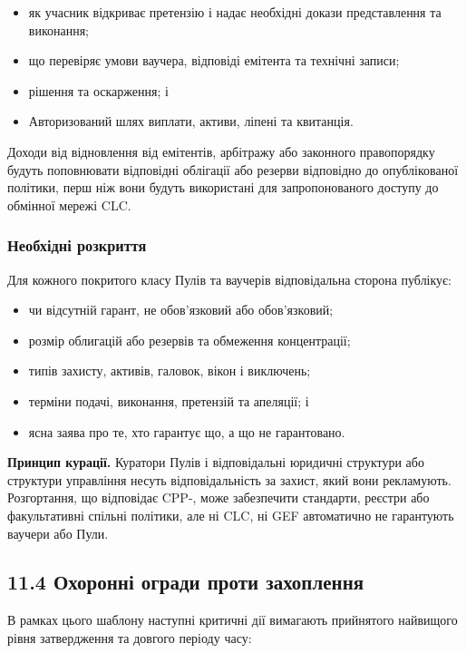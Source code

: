 \documentclass[11pt]{article}
\begin{document}
\begin{itemize}[leftmargin=*]
\item як учасник відкриває претензію і надає необхідні докази представлення та виконання;
\item що перевіряє умови ваучера, відповіді емітента та технічні записи;
\item рішення та оскарження; і
\item Авторизований шлях виплати, активи, ліпені та квитанція.
\end{itemize}
Доходи від відновлення від емітентів, арбітражу або законного правопорядку будуть поповнювати відповідні облігації або резерви відповідно до опублікованої політики, перш ніж вони будуть використані для запропонованого доступу до обмінної мережі CLC.

\subsubsection*{Необхідні розкриття}

Для кожного покритого класу Пулів та ваучерів відповідальна сторона публікує:

\begin{itemize}[leftmargin=*]
\item чи відсутній гарант, не обов'язковий або обов'язковий;
\item розмір облигацій або резервів та обмеження концентрації;
\item типів захисту, активів, галовок, вікон і виключень;
\item терміни подачі, виконання, претензій та апеляції; і
\item ясна заява про те, хто гарантує що, а що не гарантовано.
\end{itemize}
\textbf{Принцип курації.} Куратори Пулів і відповідальні юридичні структури або структури управління несуть відповідальність за захист, який вони рекламують. Розгортання, що відповідає CPP-, може забезпечити стандарти, реєстри або факультативні спільні політики, але ні CLC, ні GEF автоматично не гарантують ваучери або Пули.

\subsection*{11.4 Охоронні огради проти захоплення}

В рамках цього шаблону наступні критичні дії вимагають прийнятого найвищого рівня затвердження та довгого періоду часу:
\end{document}
